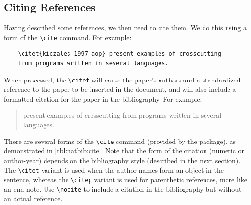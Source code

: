 \subsection{Citing References}

Having described some references, we then need to cite them.  We
do this using a form of the \verb+\cite+ command.  For example:
\begin{lstlisting}
    \citet{kiczales-1997-aop} present examples of crosscutting 
    from programs written in several languages.
\end{lstlisting}
When processed, the \verb+\citet+ will cause the paper's authors
and a standardized reference to the paper to be inserted in the
document, and will also include a formatted citation for the paper
in the bibliography.  For example:
\begin{quote}
    \citet{kiczales-1997-aop} present examples of crosscutting 
    from programs written in several languages.
\end{quote}
There are several forms of the \verb+\cite+ command (provided
by the  package), as demonstrated in
\autoref{tbl:natbib:cite}.
Note that the form of the citation (numeric or author-year) depends
on the bibliography style (described in the next section).
The \verb+\citet+ variant is used when the author names form
an object in the sentence, whereas the \verb+\citep+ variant
is used for parenthetic references, more like an end-note.
Use \verb+\nocite+ to include a citation in the bibliography
but without an actual reference.
\nocite{rowling-1997-hpps}
